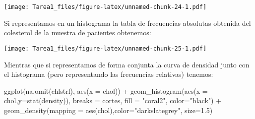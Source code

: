 \documentclass[
]{article}
\newenvironment{Shaded}{\begin{snugshade}}{\end{snugshade}}
\newcommand{\AttributeTok}[1]{\textcolor[rgb]{0.77,0.63,0.00}{#1}}
\newcommand{\ConstantTok}[1]{\textcolor[rgb]{0.00,0.00,0.00}{#1}}
\newcommand{\DecValTok}[1]{\textcolor[rgb]{0.00,0.00,0.81}{#1}}
\newcommand{\FloatTok}[1]{\textcolor[rgb]{0.00,0.00,0.81}{#1}}
\newcommand{\FunctionTok}[1]{\textcolor[rgb]{0.00,0.00,0.00}{#1}}
\newcommand{\NormalTok}[1]{#1}
\newcommand{\OtherTok}[1]{\textcolor[rgb]{0.56,0.35,0.01}{#1}}
\newcommand{\SpecialCharTok}[1]{\textcolor[rgb]{0.00,0.00,0.00}{#1}}
\newcommand{\StringTok}[1]{\textcolor[rgb]{0.31,0.60,0.02}{#1}}
\begin{document}
\begin{Shaded}
\end{Shaded}

\texttt{[image: Tarea1\_files/figure-latex/unnamed-chunk-24-1.pdf]}

Si representamos en un histograma la tabla de frecuencias absolutas
obtenida del colesterol de la muestra de pacientes obtenemos:

\begin{Shaded}
\end{Shaded}

\texttt{[image: Tarea1\_files/figure-latex/unnamed-chunk-25-1.pdf]}

Mientras que si representamos de forma conjunta la curva de densidad
junto con el histograma (pero representando las frecuencias relativas)
tenemos:

\begin{Shaded}
\begin{Highlighting}[]
\FunctionTok{ggplot}\NormalTok{(}\FunctionTok{na.omit}\NormalTok{(chlstrl), }\FunctionTok{aes}\NormalTok{(}\AttributeTok{x =}\NormalTok{ chol)) }\SpecialCharTok{+}
  \FunctionTok{geom\_histogram}\NormalTok{(}\FunctionTok{aes}\NormalTok{(}\AttributeTok{x =}\NormalTok{ chol,}\AttributeTok{y=}\FunctionTok{stat}\NormalTok{(density)),}
                 \AttributeTok{breaks =}\NormalTok{ cortes, }\AttributeTok{fill =} \StringTok{"coral2"}\NormalTok{, }\AttributeTok{color=}\StringTok{"black"}\NormalTok{)  }\SpecialCharTok{+}
  \FunctionTok{geom\_density}\NormalTok{(}\AttributeTok{mapping =} \FunctionTok{aes}\NormalTok{(chol),}\AttributeTok{color=}\StringTok{"darkslategrey"}\NormalTok{, }\AttributeTok{size=}\FloatTok{1.5}\NormalTok{)}
\end{Highlighting}
\end{Shaded}
\end{document}
